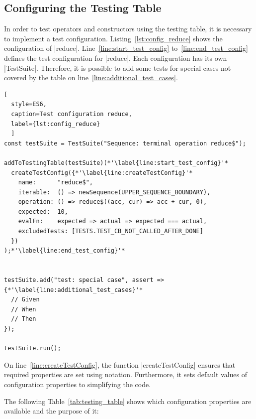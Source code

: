 \subsection{Configuring the Testing Table}
\label{sub:Configuring the Testing Table}

In order to test operators and constructors using the testing table, it is
necessary to implement a test configuration.
Listing~\ref{lst:config_reduce} shows the configuration of |reduce|. 
Line~\ref{line:start_test_config} to~\ref{line:end_test_config} defines the test 
configuration for |reduce|. Each configuration has its own |TestSuite|. Therefore, it is possible to add
some tests for special cases not covered by the table on line~\ref{line:additional_test_cases}.


\begin{lstlisting}[
  style=ES6, 
  caption=Test configuration reduce,
  label={lst:config_reduce}
  ]
const testSuite = TestSuite("Sequence: terminal operation reduce$");

addToTestingTable(testSuite)(*'\label{line:start_test_config}'*
  createTestConfig({*'\label{line:createTestConfig}'*
    name:      "reduce$",
    iterable:  () => newSequence(UPPER_SEQUENCE_BOUNDARY),
    operation: () => reduce$((acc, cur) => acc + cur, 0),
    expected:  10,
    evalFn:    expected => actual => expected === actual,
    excludedTests: [TESTS.TEST_CB_NOT_CALLED_AFTER_DONE]
  })
);*'\label{line:end_test_config}'*


testSuite.add("test: special case", assert => {*'\label{line:additional_test_cases}'*
  // Given
  // When
  // Then
});

testSuite.run();
\end{lstlisting}

On line~\ref{line:createTestConfig}, the function |createTestConfig| ensures
that required properties are set using notation. Furthermore, it sets default
values of configuration properties to simplifying the code.

The following Table~\ref{tab:testing_table} shows which configuration 
properties are available and the purpose of it:


